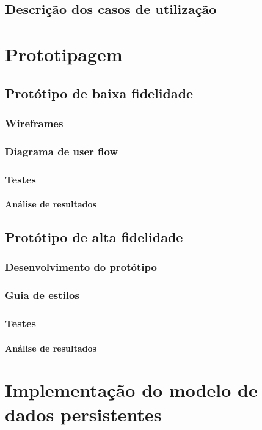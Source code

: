 \documentclass[11pt, twoside]{report}
\begin{document}
	
	\section{Descrição dos casos de utilização}
	
	\chapter{Prototipagem}
	\section{Protótipo de baixa fidelidade}
	\subsection{Wireframes}
	\subsection{Diagrama de user flow}
	\subsection{Testes}
	\subsubsection{Análise de resultados}
	
	\section{Protótipo de alta fidelidade}
	\subsection{Desenvolvimento do protótipo}
	\subsection{Guia de estilos}
	\subsection{Testes}
	\subsubsection{Análise de resultados}
	
	\chapter{Implementação do modelo de dados persistentes}
\end{document}
